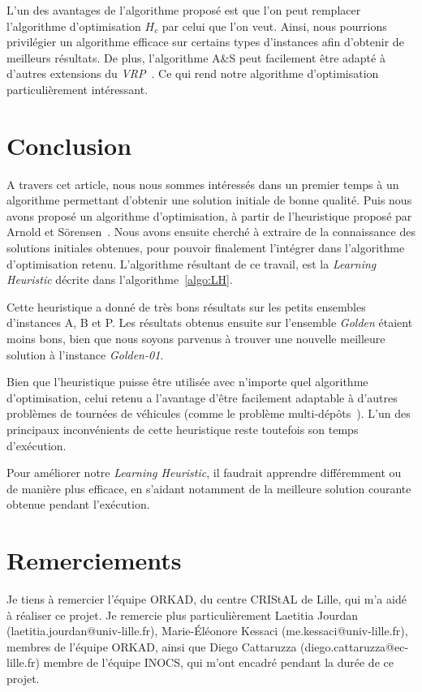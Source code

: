 \documentclass[a4paper,11pt]{article}%
\begin{document}
L'un des avantages de l'algorithme proposé est que l'on peut remplacer l'algorithme d'optimisation $H_c$ par celui que l'on veut. Ainsi, nous pourrions privilégier un algorithme efficace sur certains types d'instances afin d'obtenir de meilleurs résultats.
De plus, l'algorithme A\&S peut facilement être adapté à d'autres extensions du \emph{VRP}~\cite{Sorensen_2017}. Ce qui rend notre algorithme d'optimisation particulièrement intéressant.

\section*{Conclusion}
A travers cet article, nous nous sommes intéressés dans un premier temps à un algorithme permettant d'obtenir une solution initiale de bonne qualité. Puis nous avons proposé un algorithme d'optimisation, à partir de l'heuristique proposé par Arnold et Sörensen~\cite{Sorensen_2017}. Nous avons ensuite cherché à extraire de la connaissance des solutions initiales obtenues, pour pouvoir finalement l'intégrer dans l'algorithme d'optimisation retenu. 
L'algorithme résultant de ce travail, est la \emph{Learning Heuristic} décrite dans l'algorithme~\ref{algo:LH}. 

Cette heuristique a donné de très bons résultats sur les petits ensembles d'instances A, B et P. Les résultats obtenus ensuite sur l'ensemble \emph{Golden} étaient moins bons, bien que nous soyons parvenus à trouver une nouvelle meilleure solution à l'instance \emph{Golden-01}.

Bien que l'heuristique puisse être utilisée avec n'importe quel algorithme d'optimisation, celui retenu a l'avantage d'être facilement adaptable à d'autres problèmes de tournées de véhicules (comme le problème multi-dépôts~\cite{Sorensen_2017}). 
L'un des principaux inconvénients de cette heuristique reste toutefois son temps d'exécution.

Pour améliorer notre \emph{Learning Heuristic}, il faudrait apprendre différemment ou de manière plus efficace, en s'aidant notamment de la meilleure solution courante obtenue pendant l'exécution. 


\section*{Remerciements}
Je tiens à remercier l'équipe ORKAD, du centre CRIStAL de Lille, qui m'a aidé à réaliser ce projet. Je remercie plus particulièrement Laetitia Jourdan (laetitia.jourdan@univ-lille.fr), Marie-Éléonore Kessaci (me.kessaci@univ-lille.fr), membres de l'équipe ORKAD, ainsi que Diego Cattaruzza (diego.cattaruzza@ec-lille.fr) membre de l'équipe INOCS, qui m'ont encadré pendant la durée de ce projet.





\end{document}

